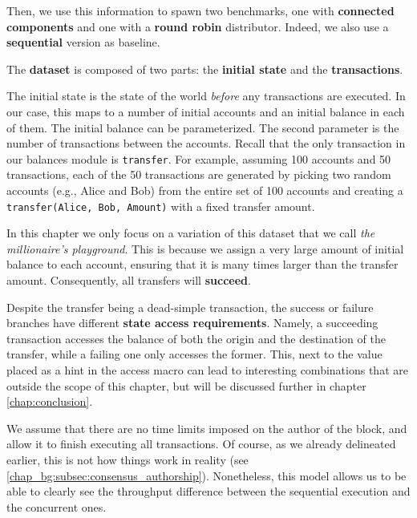 Then, we use this information to spawn two benchmarks, one with \textbf{connected components} and
one with a \textbf{round robin} distributor. Indeed, we also use a \textbf{sequential} version as
baseline.

The \textbf{dataset} is composed of two parts: the \textbf{initial state} and the
\textbf{transactions}.

The initial state is the state of the world \textit{before} any transactions are executed. In our
case, this maps to a number of initial accounts and an initial balance in each of them. The initial
balance can be parameterized. The second parameter is the number of transactions between the
accounts. Recall that the only transaction in our balances module is \texttt{transfer}. For example,
assuming 100 accounts and 50 transactions, each of the 50 transactions are generated by picking two
random accounts (e.g., Alice and Bob) from the entire set of 100 accounts and creating a
\texttt{transfer(Alice, Bob, Amount)} with a fixed transfer amount.

In this chapter we only focus on a variation of this dataset that we call \textit{the millionaire's
playground}. This is because we assign a very large amount of initial balance to each account,
ensuring that it is many times larger than the transfer amount. Consequently, all transfers will
\textbf{succeed}.

\begin{remark}
	Despite the transfer being a dead-simple transaction, the success or failure branches have
	different \textbf{state access requirements}. Namely, a succeeding transaction accesses the
	balance of both the origin and the destination of the transfer, while a failing one only
	accesses the former. This, next to the value placed as a hint in the access macro can lead to
	interesting combinations that are outside the scope of this chapter, but will be discussed
	further in chapter \ref{chap:conclusion}.
\end{remark}

We assume that there are no time limits imposed on the author of the block, and allow it to finish
executing all transactions. Of course, as we already delineated earlier, this is not how things work
in reality (see \ref{chap_bg:subsec:consensus_authorship}). Nonetheless, this model allows us to be
able to clearly see the throughput difference between the sequential execution and the concurrent
ones.

